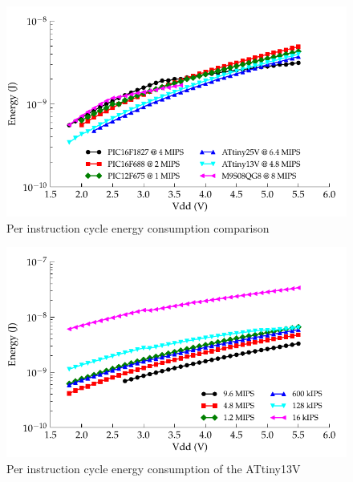\begin{figure}
\begin{centering}
\includegraphics{content/pt1/02-Microcontrollers/graphics/Graph_All_Clock_JPI}
\par\end{centering}

\protect\caption{\label{fig:Per-instruction-cycle}Per instruction cycle energy consumption
comparison}
\end{figure}
\begin{figure}
\begin{centering}
\includegraphics{content/pt1/02-Microcontrollers/graphics/Graph_ATtiny13V_Clock_JPI}
\par\end{centering}

\protect\caption{\label{fig:Per-instruction-ATtiny13V}Per instruction cycle energy
consumption of the ATtiny13V}
\end{figure}



